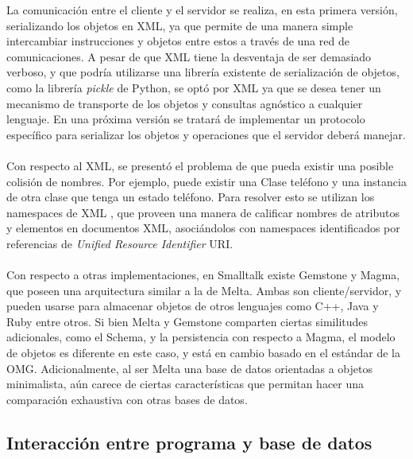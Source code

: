 \documentclass{melta}
\begin{document}
La comunicación entre el cliente y el servidor se realiza, en esta primera versión, serializando los objetos en XML, ya que permite de una manera simple intercambiar instrucciones y objetos entre estos a través de una red de comunicaciones. A pesar de que XML tiene la desventaja de ser demasiado verboso, y que podría utilizarse una librería existente de serialización de objetos, como la librería \textit{pickle} de Python, se optó por XML ya que se desea tener un mecanismo de transporte de los objetos y consultas agnóstico a cualquier lenguaje. En una próxima versión se tratará de implementar un protocolo específico para serializar los objetos y operaciones que el servidor deberá manejar.
\\\\
Con respecto al XML, se presentó el problema de que pueda existir una posible colisión de nombres. Por ejemplo, puede existir una Clase teléfono y una instancia de otra clase que tenga un estado teléfono. Para resolver esto se utilizan los namespaces de XML \cite{xml:BHL06}, que proveen una manera de calificar nombres de atributos y elementos en documentos XML, asociándolos con namespaces identificados por referencias de \textit{Unified Resource Identifier} URI.
\\\\
Con respecto a otras implementaciones, en Smalltalk existe Gemstone y Magma, que poseen una arquitectura similar a la de Melta. Ambas son cliente/servidor, y pueden usarse para almacenar objetos de otros lenguajes como C++, Java y Ruby entre otros. Si bien Melta y Gemstone comparten ciertas similitudes adicionales, como el Schema, y la persistencia con respecto a Magma, el modelo de objetos es diferente en este caso, y está en cambio basado en el estándar de la OMG. Adicionalmente, al ser Melta una base de datos orientadas a objetos minimalista, aún carece de ciertas características que permitan hacer una comparación exhaustiva con otras bases de datos. 

\subsection*{Interacción entre programa y base de datos}
\end{document}
